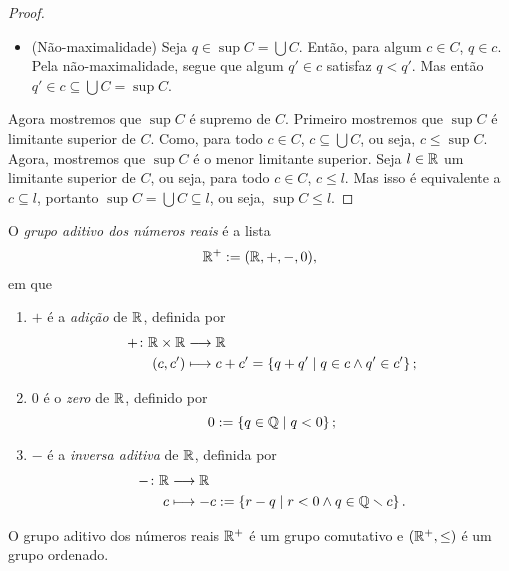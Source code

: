 \begin{proof}
\begin{itemize}
	\item (Não-maximalidade) Seja $q \in \sup C = \bigcup C$. Então, para algum $c \in C$, $q \in c$. Pela não-maximalidade, segue que algum $q' \in c$ satisfaz $q < q'$. Mas então $q' \in c \subseteq \bigcup C = \sup C$.
	\end{itemize}

Agora mostremos que $\sup C$ é supremo de $C$. Primeiro mostremos que $\sup C$ é limitante superior de $C$. Como, para todo $c \in C$, $c \subseteq \bigcup C$, ou seja, $c \leq \sup C$. Agora, mostremos que $\sup C$ é o menor limitante superior. Seja $l \in \mathbb{R}$ um limitante superior de $C$, ou seja, para todo $c \in C$, $c \leq l$. Mas isso é equivalente a $c \subseteq l$, portanto $\sup C = \bigcup C \subseteq l$, ou seja, $\sup C \leq l$.
\end{proof}

\begin{definition}
O \emph{grupo aditivo dos números reais} é a lista
	\begin{equation*}
	\mathbb{R}^+ := (\mathbb{R},+,-,0),
	\end{equation*}
em que
	\begin{enumerate}
	\item $+$ é a \emph{adição} de $\mathbb{R}$, definida por
		\begin{align*}
		{+}\colon {\mathbb{R}\times \mathbb{R}} &\longrightarrow {\mathbb{R}} \\{(c,c')} &\longmapsto c+c' = \left\{{q+q'}\;\middle\vert\;{q \in c \land q' \in c'}\right\};
		\end{align*}
	\item $0$ é o \emph{zero} de $\mathbb{R}$, definido por
		\begin{equation*}
		0 := \left\{{q \in \mathbb{Q}}\;\middle\vert\;{q < 0}\right\};
		\end{equation*}
	\item $-$ é a \emph{inversa aditiva} de $\mathbb{R}$, definida por
		\begin{align*}
		{-}\colon {\mathbb{R}} &\longrightarrow {\mathbb{R}} \\{c} &\longmapsto -c := \left\{{r-q}\;\middle\vert\;{r < 0 \land q \in \mathbb{Q} \smallsetminus c}\right\}.
		\end{align*}
	\end{enumerate}
\end{definition}

\begin{exercise}
O grupo aditivo dos números reais $\mathbb{R}^+$ é um grupo comutativo e $(\mathbb{R}^+,\leq)$ é um grupo ordenado.
\end{exercise}

